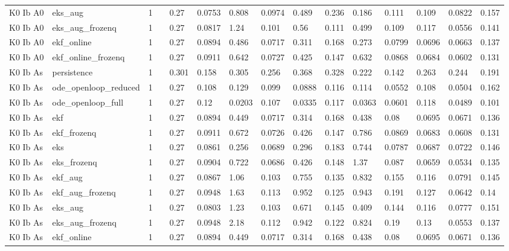 \begin{table}[t]
\begin{tabular}{lllllllllllllll}
K0 Ib A0 & eks\_aug & 1 &  & 0.27 & 0.0753 & 0.808 & 0.0974 & 0.489 & 0.236 & 0.186 & 0.111 & 0.109 & 0.0822 & 0.157 \\
K0 Ib A0 & eks\_aug\_frozenq & 1 &  & 0.27 & 0.0817 & 1.24 & 0.101 & 0.56 & 0.111 & 0.499 & 0.109 & 0.117 & 0.0556 & 0.141 \\
K0 Ib A0 & ekf\_online & 1 &  & 0.27 & 0.0894 & 0.486 & 0.0717 & 0.311 & 0.168 & 0.273 & 0.0799 & 0.0696 & 0.0663 & 0.137 \\
K0 Ib A0 & ekf\_online\_frozenq & 1 &  & 0.27 & 0.0911 & 0.642 & 0.0727 & 0.425 & 0.147 & 0.632 & 0.0868 & 0.0684 & 0.0602 & 0.131 \\
K0 Ib As & persistence & 1 &  & 0.301 & 0.158 & 0.305 & 0.256 & 0.368 & 0.328 & 0.222 & 0.142 & 0.263 & 0.244 & 0.191 \\
K0 Ib As & ode\_openloop\_reduced & 1 &  & 0.27 & 0.108 & 0.129 & 0.099 & 0.0888 & 0.116 & 0.114 & 0.0552 & 0.108 & 0.0504 & 0.162 \\
K0 Ib As & ode\_openloop\_full & 1 &  & 0.27 & 0.12 & 0.0203 & 0.107 & 0.0335 & 0.117 & 0.0363 & 0.0601 & 0.118 & 0.0489 & 0.101 \\
K0 Ib As & ekf & 1 &  & 0.27 & 0.0894 & 0.449 & 0.0717 & 0.314 & 0.168 & 0.438 & 0.08 & 0.0695 & 0.0671 & 0.136 \\
K0 Ib As & ekf\_frozenq & 1 &  & 0.27 & 0.0911 & 0.672 & 0.0726 & 0.426 & 0.147 & 0.786 & 0.0869 & 0.0683 & 0.0608 & 0.131 \\
K0 Ib As & eks & 1 &  & 0.27 & 0.0861 & 0.256 & 0.0689 & 0.296 & 0.183 & 0.744 & 0.0787 & 0.0687 & 0.0722 & 0.146 \\
K0 Ib As & eks\_frozenq & 1 &  & 0.27 & 0.0904 & 0.722 & 0.0686 & 0.426 & 0.148 & 1.37 & 0.087 & 0.0659 & 0.0534 & 0.135 \\
K0 Ib As & ekf\_aug & 1 &  & 0.27 & 0.0867 & 1.06 & 0.103 & 0.755 & 0.135 & 0.832 & 0.155 & 0.116 & 0.0791 & 0.145 \\
K0 Ib As & ekf\_aug\_frozenq & 1 &  & 0.27 & 0.0948 & 1.63 & 0.113 & 0.952 & 0.125 & 0.943 & 0.191 & 0.127 & 0.0642 & 0.14 \\
K0 Ib As & eks\_aug & 1 &  & 0.27 & 0.0803 & 1.23 & 0.103 & 0.671 & 0.145 & 0.409 & 0.144 & 0.116 & 0.0777 & 0.151 \\
K0 Ib As & eks\_aug\_frozenq & 1 &  & 0.27 & 0.0948 & 2.18 & 0.112 & 0.942 & 0.122 & 0.824 & 0.19 & 0.13 & 0.0553 & 0.137 \\
K0 Ib As & ekf\_online & 1 &  & 0.27 & 0.0894 & 0.449 & 0.0717 & 0.314 & 0.168 & 0.438 & 0.08 & 0.0695 & 0.0671 & 0.136 \\

\end{tabular}
\end{table}
